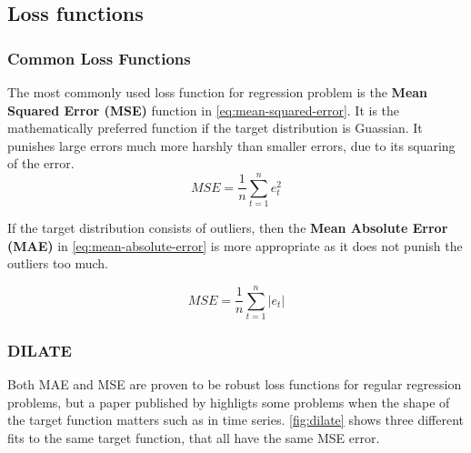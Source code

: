 \subsection{Loss functions}
\label{loss-functions}


\subsubsection{Common Loss Functions}
The most commonly used loss function for regression problem is the 
\textbf{Mean Squared Error (MSE)} function in \autoref{eq:mean-squared-error}.
It is the mathematically preferred function if the target distribution is Guassian.
It punishes large errors much more harshly than smaller errors, due to its squaring of the error.
\begin{equation}
  \label{eq:mean-squared-error}
  MSE = \frac{1}{n} \sum_{t=1}^n e_t^2
\end{equation}

If the target distribution consists of outliers, then the 
\textbf{Mean Absolute Error (MAE)} in \autoref{eq:mean-absolute-error} is more appropriate
as it does not punish the outliers too much.

\begin{equation}
  \label{eq:mean-absolute-error}
  MSE = \frac{1}{n} \sum_{t=1}^n |e_t|
\end{equation}

\subsubsection{ DILATE }

Both MAE and MSE are proven to be robust loss functions for regular regression problems,
but a paper published by \citeauthor{Guen2019} highligts some problems when the shape of the target function matters
such as in time series.
\autoref{fig:dilate} shows three different fits to the same target function, that all have
the same MSE error.

